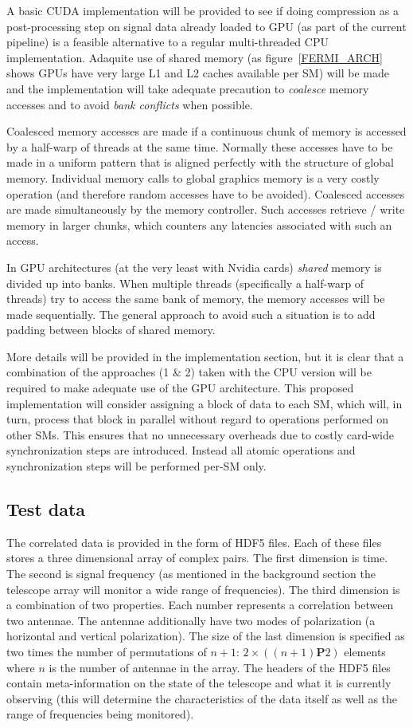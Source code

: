 A basic CUDA implementation will be provided to see if doing compression as a post-processing step on signal data already loaded to GPU (as part of the current pipeline) is a 
feasible alternative to a regular multi-threaded CPU implementation. Adaquite use of shared memory (as figure~\ref{FERMI_ARCH} shows GPUs have very large L1 and L2 caches available per SM) 
will be made and the implementation will take adequate precaution to \textit{coalesce} memory accesses and to avoid \textit{bank conflicts} when possible. 

Coalesced memory accesses are made if a continuous chunk of memory is accessed by a half-warp of threads at the same time. Normally these accesses have to be made in a uniform pattern that is aligned perfectly
with the structure of global memory. Individual memory calls to global graphics memory is a very costly operation (and therefore random accesses have to be avoided). Coalesced accesses are made simultaneously by 
the memory controller. Such accesses retrieve / write memory in larger chunks, which counters any latencies associated with such an access. 

In GPU architectures (at the very least with Nvidia cards) \emph{shared} memory is divided up into banks. When multiple threads (specifically a half-warp of threads) try to 
access the same bank of memory, the memory accesses will be made sequentially. The general approach to avoid such a situation is to add padding between blocks of shared memory.

More details will be provided in the implementation section, but it is clear that a combination of the approaches (1 \& 2) taken with the CPU version will be required to make 
adequate use of the GPU architecture. This proposed implementation will consider assigning a block of data to each SM, which will, in turn, process that block in parallel without 
regard to operations performed on other SMs. This ensures that no unnecessary overheads due to costly card-wide synchronization steps are introduced. Instead all atomic 
operations and synchronization steps will be performed per-SM only.
\subsection{Test data}
The correlated data is provided in the form of HDF5 files. Each of these files stores a three dimensional array of complex pairs. The first dimension is time. The second 
is signal frequency (as mentioned in the background section the telescope array will monitor a wide range of frequencies). The third dimension is a combination of two 
properties. Each number represents a correlation between two antennae. The antennae additionally have two modes of polarization (a horizontal and vertical polarization). 
The size of the last dimension is specified as two times the number of permutations of $n + 1$: $2\times((n+1)\mathbf{P}2)$ elements where $n$ is the number of
antennae in the array. The headers of the HDF5 files contain meta-information on the state of the telescope and what it is currently observing (this will determine the 
characteristics of the data itself as well as the range of frequencies being monitored). 

